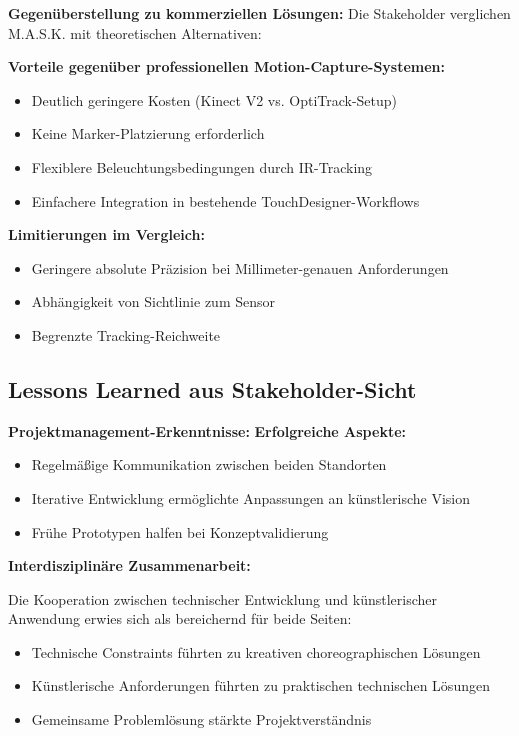 \textbf{Gegenüberstellung zu kommerziellen Lösungen:}
Die Stakeholder verglichen M.A.S.K. mit theoretischen Alternativen:

\textbf{Vorteile gegenüber professionellen Motion-Capture-Systemen:}
\begin{itemize}
    \item Deutlich geringere Kosten (Kinect V2 vs. OptiTrack-Setup)
    \item Keine Marker-Platzierung erforderlich
    \item Flexiblere Beleuchtungsbedingungen durch IR-Tracking
    \item Einfachere Integration in bestehende TouchDesigner-Workflows
\end{itemize}

\textbf{Limitierungen im Vergleich:}
\begin{itemize}
    \item Geringere absolute Präzision bei Millimeter-genauen Anforderungen
    \item Abhängigkeit von Sichtlinie zum Sensor
    \item Begrenzte Tracking-Reichweite
\end{itemize}

\subsection{Lessons Learned aus Stakeholder-Sicht}

\textbf{Projektmanagement-Erkenntnisse:}
\textbf{Erfolgreiche Aspekte:}
\begin{itemize}
    \item Regelmäßige Kommunikation zwischen beiden Standorten
    \item Iterative Entwicklung ermöglichte Anpassungen an künstlerische Vision
    \item Frühe Prototypen halfen bei Konzeptvalidierung
\end{itemize}

\textbf{Interdisziplinäre Zusammenarbeit:}
\raggedright Die Kooperation zwischen technischer Entwicklung und künstlerischer Anwendung erwies sich als bereichernd für beide Seiten:

\begin{itemize}
    \item Technische Constraints führten zu kreativen choreographischen Lösungen
    \item Künstlerische Anforderungen führten zu praktischen technischen Lösungen
    \item Gemeinsame Problemlösung stärkte Projektverständnis
\end{itemize}


